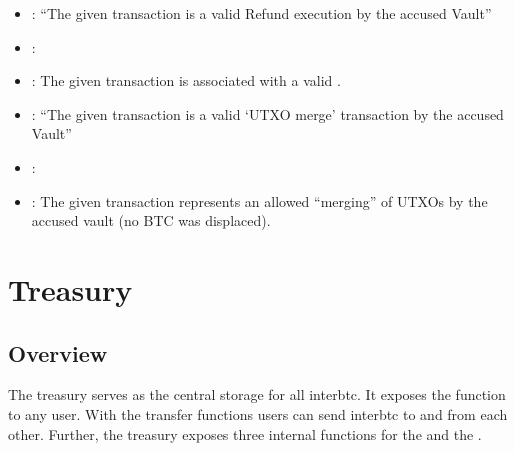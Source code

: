 \documentclass[a4paper,10pt,english]{sphinxmanual}
\begin{document}
\begin{itemize}
\item {} 
: “The given transaction is a valid Refund execution by the accused Vault”

\item {} 
: {\hyperref[\detokenize{spec/staked-relayers:reportvaulttheft}]{}}

\item {} 
: The given transaction is associated with a valid {\hyperref[\detokenize{spec/refund:refund-protocol}]{}}.

\end{itemize}

\begin{itemize}
\item {} 
: “The given transaction is a valid ‘UTXO merge’ transaction by the accused Vault”

\item {} 
: {\hyperref[\detokenize{spec/staked-relayers:reportvaulttheft}]{}}

\item {} 
: The given transaction represents an allowed “merging” of UTXOs by the accused vault (no BTC was displaced).

\end{itemize}


\chapter{Treasury}
\label{\detokenize{spec/treasury:treasury}}\label{\detokenize{spec/treasury:treasury-module}}\label{\detokenize{spec/treasury::doc}}

\section{Overview}
\label{\detokenize{spec/treasury:overview}}
The treasury serves as the central storage for all interbtc.
It exposes the {\hyperref[\detokenize{spec/treasury:transfer}]{}} function to any user. With the transfer functions users can send interbtc to and from each other.
Further, the treasury exposes three internal functions for the {\hyperref[\detokenize{spec/issue:issue-protocol}]{}} and the {\hyperref[\detokenize{spec/redeem:redeem-protocol}]{}}.
\end{document}
